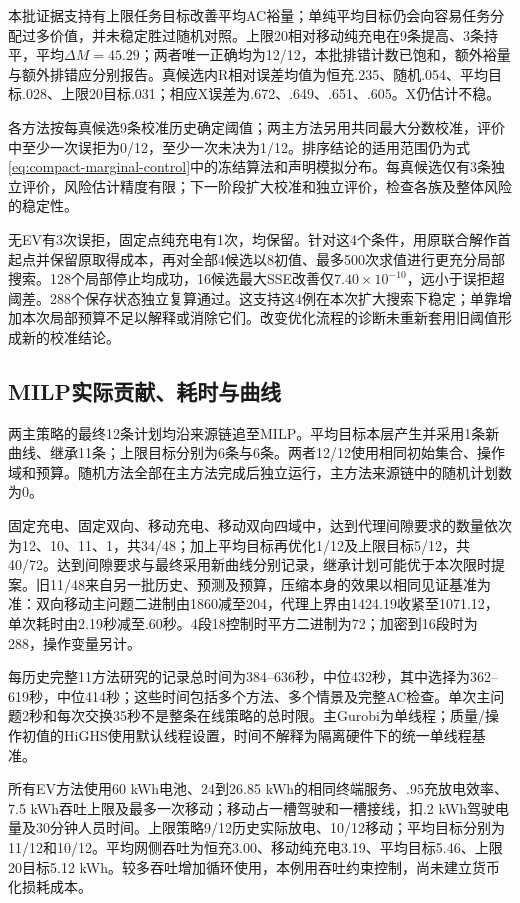 \documentclass[UTF8,fontset=fandol,11pt,a4paper]{ctexart}
\begin{document}
本批证据支持有上限任务目标改善平均AC裕量；单纯平均目标仍会向容易任务分配过多价值，并未稳定胜过随机对照。上限20相对移动纯充电在9条提高、3条持平，平均$\Delta M=45.29$；两者唯一正确均为12/12，本批排错计数已饱和，额外裕量与额外排错应分别报告。真候选内R相对误差均值为恒充.235、随机.054、平均目标.028、上限20目标.031；相应X误差为.672、.649、.651、.605。X仍估计不稳。

各方法按每真候选9条校准历史确定阈值；两主方法另用共同最大分数校准，评价中至少一次误拒为0/12，至少一次未决为1/12。排序结论的适用范围仍为式\eqref{eq:compact-marginal-control}中的冻结算法和声明模拟分布。每真候选仅有3条独立评价，风险估计精度有限；下一阶段扩大校准和独立评价，检查各族及整体风险的稳定性。

无EV有3次误拒，固定点纯充电有1次，均保留。针对这4个条件，用原联合解作首起点并保留原取得成本，再对全部4候选以8初值、最多500次求值进行更充分局部搜索。128个局部停止均成功，16候选最大SSE改善仅$7.40\times10^{-10}$，远小于误拒超阈差。288个保存状态独立复算通过。这支持这4例在本次扩大搜索下稳定；单靠增加本次局部预算不足以解释或消除它们。改变优化流程的诊断未重新套用旧阈值形成新的校准结论。

\subsection{MILP实际贡献、耗时与曲线}
两主策略的最终12条计划均沿来源链追至MILP。平均目标本层产生并采用1条新曲线、继承11条；上限目标分别为6条与6条。两者12/12使用相同初始集合、操作域和预算。随机方法全部在主方法完成后独立运行，主方法来源链中的随机计划数为0。

固定充电、固定双向、移动充电、移动双向四域中，达到代理间隙要求的数量依次为12、10、11、1，共34/48；加上平均目标再优化1/12及上限目标5/12，共40/72。达到间隙要求与最终采用新曲线分别记录，继承计划可能优于本次限时提案。旧11/48来自另一批历史、预测及预算，压缩本身的效果以相同见证基准为准：双向移动主问题二进制由1860减至204，代理上界由1424.19收紧至1071.12，单次耗时由2.19秒减至.60秒。4段18控制时平方二进制为72；加密到16段时为288，操作变量另计。

每历史完整11方法研究的记录总时间为384--636秒，中位432秒，其中选择为362--619秒，中位414秒；这些时间包括多个方法、多个情景及完整AC检查。单次主问题2秒和每次交换35秒不是整条在线策略的总时限。主Gurobi为单线程；质量/操作初值的HiGHS使用默认线程设置，时间不解释为隔离硬件下的统一单线程基准。

所有EV方法使用60 kWh电池、24到26.85 kWh的相同终端服务、.95充放电效率、7.5 kWh吞吐上限及最多一次移动；移动占一槽驾驶和一槽接线，扣.2 kWh驾驶电量及30分钟人员时间。上限策略9/12历史实际放电、10/12移动；平均目标分别为11/12和10/12。平均网侧吞吐为恒充3.00、移动纯充电3.19、平均目标5.46、上限20目标5.12 kWh。较多吞吐增加循环使用，本例用吞吐约束控制，尚未建立货币化损耗成本。
\end{document}
